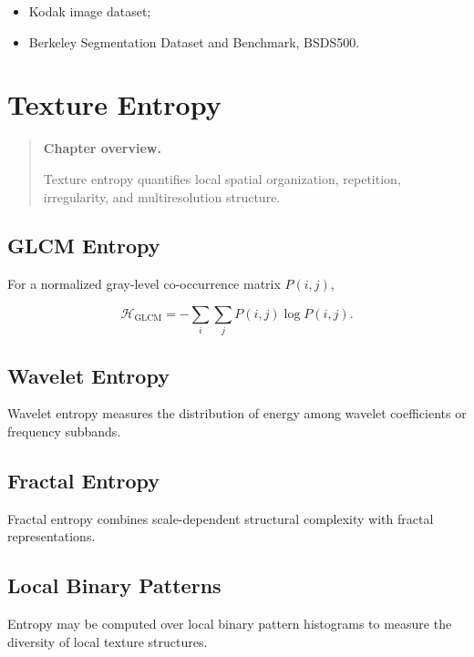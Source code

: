 \documentclass[11pt,oneside]{book}
\theoremstyle{remark}
\newcommand{\Entropy}{\mathcal{H}}
\newenvironment{chapteroverview}
{
	\begin{quote}
		\small
		\textbf{Chapter overview.}
	}
	{
	\end{quote}
}
\newenvironment{datasetlist}
{
	\begin{itemize}[label=\(\triangleright\)]
	}
	{
	\end{itemize}
}
\begin{document}
	\begin{datasetlist}
		\item Kodak image dataset;
		\item Berkeley Segmentation Dataset and Benchmark, BSDS500.
	\end{datasetlist}
	
	
	\chapter{Texture Entropy}
	\label{chap:texture-entropy}
	
	\begin{chapteroverview}
		Texture entropy quantifies local spatial organization, repetition,
		irregularity, and multiresolution structure.
	\end{chapteroverview}
	
	\section{GLCM Entropy}
	
	For a normalized gray-level co-occurrence matrix \(P(i,j)\),
	
	\[
	\Entropy_{\mathrm{GLCM}}
	=
	-\sum_i\sum_j
	P(i,j)\log P(i,j).
	\]
	
	\section{Wavelet Entropy}
	
	Wavelet entropy measures the distribution of energy among wavelet
	coefficients or frequency subbands.
	
	\section{Fractal Entropy}
	
	Fractal entropy combines scale-dependent structural complexity with
	fractal representations.
	
	\section{Local Binary Patterns}
	
	Entropy may be computed over local binary pattern histograms to measure the
	diversity of local texture structures.
	
\end{document}
